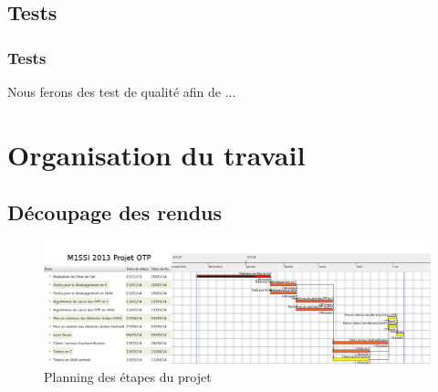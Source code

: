 \documentclass{beamer}
\begin{document}
\subsection{Tests}

\begin{frame}
\frametitle{Tests}
Nous ferons des test de qualité afin de ...
\end{frame}

\section{Organisation du travail}

\subsection{Découpage des rendus}
\begin{frame}
  \begin{figure}
    \includegraphics[scale=0.1]{img/gantt.png} %
    \caption{Planning des étapes du projet}
  \end{figure}
\end{frame}
\end{document}
